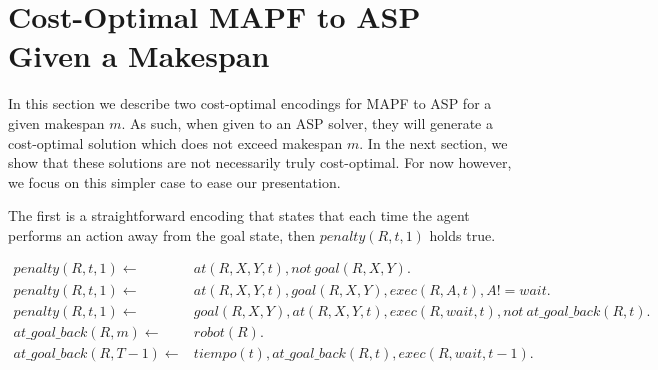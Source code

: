 \section{Cost-Optimal MAPF to ASP Given a Makespan}
In this section we describe two cost-optimal encodings for MAPF to ASP for a given makespan $m$. As such, when given to an ASP solver, they will generate a cost-optimal solution which does not exceed makespan $m$. In the next section, we show that these solutions are not necessarily truly cost-optimal. For now however, we focus on this simpler case to ease our presentation.

The first is a straightforward encoding that states that each time the agent performs an action away from the goal state, then $penalty(R,t,1)$ holds true.

\begin{align*}
penalty(R,t,1) \leftarrow &at(R,X,Y,t), not\: goal(R,X,Y). \\
penalty(R,t,1) \leftarrow &at(R,X,Y,t), goal(R,X,Y), exec(R,A,t),A!=wait. \\
penalty(R,t,1) \leftarrow &goal(R,X,Y), at(R,X,Y,t), exec(R,wait,t), not\: at\_goal\_back(R,t). \\
at\_goal\_back(R,m) \leftarrow &robot(R). \\
at\_goal\_back(R,T-1) \leftarrow &tiempo(t),at\_goal\_back(R,t),exec(R,wait,t-1). 
\end{align*}
